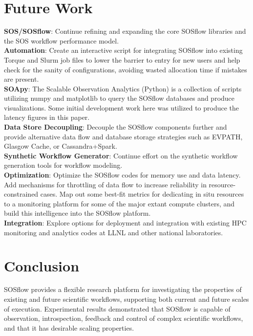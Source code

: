 

\section{Future Work} %
%
\textbf{SOS/SOSflow}: Continue refining and expanding the core SOSflow
libraries and the SOS workflow performance model.
\\
\textbf{Automation}: Create an interactive script for integrating
SOSflow into existing Torque and Slurm job files to lower the barrier
to entry for new users and help check for the sanity of configurations,
avoiding wasted allocation time if mistakes are present.
\\
\textbf{SOApy}: The Scalable Observation Analytics (Python) is a
collection of scripts utilizing numpy and matplotlib to query the
SOSflow databases and produce visualizations. Some initial development
work here was utilized to produce the latency figures in this paper.
\\
\textbf{Data Store Decoupling}: Decouple the
SOSflow components further and provide alternative data flow and
database storage strategies such as EVPATH, Glasgow Cache, or
Cassandra+Spark.
\\
\textbf{Synthetic Workflow Generator}: Continue effort on the 
synthetic workflow generation tools for workflow modeling.
\\
\textbf{Optimization}: Optimize the SOSflow codes for memory use
and data latency. Add mechanisms for throttling of data flow to
increase reliability in resource-constrained cases. Map out some
best-fit metrics for dedicating in situ resources to a monitoring
platform for some of the major extant compute clusters, and build this
intelligence into the SOSflow platform.
\\
\textbf{Integration}: Explore options for deployment and integration with
existing HPC monitoring and analytics codes at LLNL and other
national laboratories.
%
%

\section{Conclusion}
%
SOSflow provides a flexible research platform for investigating the
properties of existing and future scientific workflows, supporting
both current and future scales of execution.
%
Experimental results demonstrated that SOSflow is capable of
observation, introspection, feedback and control of complex scientific
workflows, and that it has desirable scaling properties.
%
%


